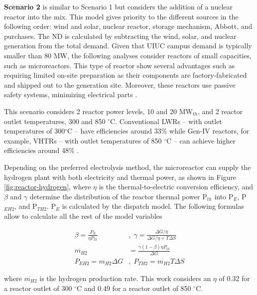 \documentclass{anstrans}
\begin{document}
\textbf{Scenario 2} is similar to Scenario 1 but considers the addition of a nuclear reactor into the mix.
This model gives priority to the different sources in the following order: wind and solar, nuclear reactor, storage mechanism, Abbott, and purchases.
The \gls{ND} is calculated by subtracting the wind, solar, and nuclear generation from the total demand.
Given that UIUC campus demand is typically smaller than 80 MW, the following analyses consider reactors of small capacities, such as microreactors.
This type of reactor show several advantages such as requiring limited on-site preparation as their components are factory-fabricated and shipped out to the generation site.
Moreover, these reactors use passive safety systems, minimizing electrical parts \cite{us-doe_ultimate_2019}.

This scenario considers 2 reactor power levels, 10 and 20 MW$_{th}$, and 2 reactor outlet temperatures, 300 and 850 $^\circ$C.
Conventional \glspl{LWR} -- with outlet temperatures of 300$^\circ$C -- have efficiencies around 33\% while Gen-IV reactors, for example, \glspl{VHTR} -- with outlet temperatures of 850 $^\circ$C -- can achieve higher efficiencies around 48\% \cite{fairhurst-agosta_multi-physics_2020}.

Depending on the preferred electrolysis method, the microreactor can supply the hydrogen plant with both electricity and thermal power, as shown in Figure \ref{fig:reactor-hydrogen}, where $\eta$ is the thermal-to-electric conversion efficiency, and $\beta$ and $\gamma$ determine the distribution of the reactor thermal power P$_{th}$ into P$_E$, P$_{EH2}$, and P$_{TH2}$.
P$_E$ is calculated by the dispatch model.
The following formulas allow to calculate all the rest of the model variables

\begin{align}
  \beta = \frac{P_{E}}{\eta P_{th}}&, \; \gamma = \frac{\Delta G / \eta}{\Delta G / \eta + T \Delta S} \\
  \dot{m_{H2}} &= \frac{\gamma (1-\beta) \eta P_{th}}{\Delta G} \\
  P_{EH2} = \dot{m_{H2}} \Delta G&, \;  P_{TH2} = \dot{m_{H2}} T \Delta S
\end{align}

where $\dot{m_{H2}}$ is the hydrogen production rate.
This work considers an $\eta$ of 0.32 for a reactor outlet of 300 $^\circ$C and 0.49 for a reactor outlet of 850 $^\circ$C.
\end{document}
